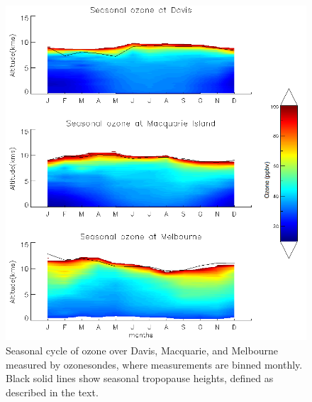 \documentclass{article}
\begin{document}
    \begin{figure}[!htbp]
      \begin{center}
      \includegraphics[width=0.8\columnwidth]{figures/seasonaltropozone}
      \caption{
      Seasonal cycle of ozone over Davis, Macquarie, and Melbourne measured by ozonesondes, where measurements are binned monthly.
      Black solid lines show seasonal tropopause heights, defined as described in the text.
      }
      \label{fig:seasonaltropozone}
      \end{center}
    \end{figure}
    
\end{document}
